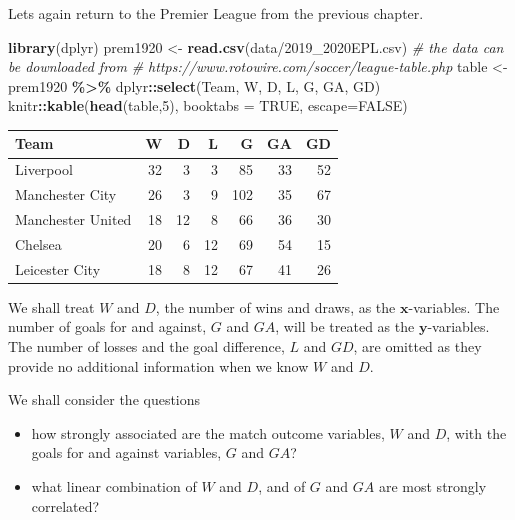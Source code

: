 \documentclass[
]{book}
\newenvironment{Shaded}{\begin{snugshade}}{\end{snugshade}}
\newcommand{\AttributeTok}[1]{\textcolor[rgb]{0.13,0.29,0.53}{#1}}
\newcommand{\CommentTok}[1]{\textcolor[rgb]{0.56,0.35,0.01}{\textit{#1}}}
\newcommand{\ConstantTok}[1]{\textcolor[rgb]{0.56,0.35,0.01}{#1}}
\newcommand{\DecValTok}[1]{\textcolor[rgb]{0.00,0.00,0.81}{#1}}
\newcommand{\FunctionTok}[1]{\textcolor[rgb]{0.13,0.29,0.53}{\textbf{#1}}}
\newcommand{\NormalTok}[1]{#1}
\newcommand{\OtherTok}[1]{\textcolor[rgb]{0.56,0.35,0.01}{#1}}
\newcommand{\SpecialCharTok}[1]{\textcolor[rgb]{0.81,0.36,0.00}{\textbf{#1}}}
\newcommand{\StringTok}[1]{\textcolor[rgb]{0.31,0.60,0.02}{#1}}
\providecommand{\tightlist}{%
  \setlength{\itemsep}{0pt}\setlength{\parskip}{0pt}}
\theoremstyle{definition}
\theoremstyle{definition}
\theoremstyle{definition}
\theoremstyle{definition}
\theoremstyle{remark}
\begin{document}
Lets again return to the Premier League from the previous chapter.

\begin{Shaded}
\begin{Highlighting}[]
\FunctionTok{library}\NormalTok{(dplyr)}
\NormalTok{prem1920 }\OtherTok{\textless{}{-}} \FunctionTok{read.csv}\NormalTok{(}\StringTok{\textquotesingle{}data/2019\_2020EPL.csv\textquotesingle{}}\NormalTok{) }
\CommentTok{\# the data can be downloaded from }
\CommentTok{\# https://www.rotowire.com/soccer/league{-}table.php}
\NormalTok{table }\OtherTok{\textless{}{-}}\NormalTok{ prem1920 }\SpecialCharTok{\%\textgreater{}\%}\NormalTok{ dplyr}\SpecialCharTok{::}\FunctionTok{select}\NormalTok{(Team, W, D, L, G, GA, GD) }
\NormalTok{knitr}\SpecialCharTok{::}\FunctionTok{kable}\NormalTok{(}\FunctionTok{head}\NormalTok{(table,}\DecValTok{5}\NormalTok{), }\AttributeTok{booktabs =} \ConstantTok{TRUE}\NormalTok{, }\AttributeTok{escape=}\ConstantTok{FALSE}\NormalTok{)}
\end{Highlighting}
\end{Shaded}

\begin{tabular}{lrrrrrr}
\toprule
Team & W & D & L & G & GA & GD\\
\midrule
Liverpool & 32 & 3 & 3 & 85 & 33 & 52\\
Manchester City & 26 & 3 & 9 & 102 & 35 & 67\\
Manchester United & 18 & 12 & 8 & 66 & 36 & 30\\
Chelsea & 20 & 6 & 12 & 69 & 54 & 15\\
Leicester City & 18 & 8 & 12 & 67 & 41 & 26\\
\bottomrule
\end{tabular}

We shall treat \(W\) and \(D\), the number of wins and draws, as the \(\mathbf x\)-variables. The number of goals for and against, \(G\) and \(GA\), will be treated as the \(\mathbf y\)-variables. The number of losses and the goal difference, \(L\) and \(GD\), are omitted as they provide no additional information when we know \(W\) and \(D\).

We shall consider the questions

\begin{itemize}
\tightlist
\item
  how strongly associated are the match outcome variables, \(W\) and \(D\), with the goals for and against variables, \(G\) and \(GA\)?
\item
  what linear combination of \(W\) and \(D\), and of \(G\) and \(GA\) are most strongly correlated?
\end{itemize}
\end{document}
